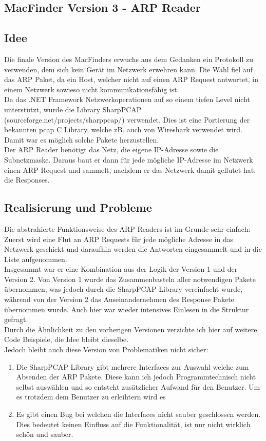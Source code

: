 \documentclass[12pt,a4paper]{report}
\begin{document}
\begin{onehalfspace}
\section{MacFinder Version 3 - ARP Reader}
\subsection{Idee}
Die finale Version des MacFinders erwuchs aus dem Gedanken ein Protokoll zu verwenden, dem sich kein Gerät im Netzwerk erwehren kann. Die Wahl fiel auf das ARP Paket, da ein Host, welcher nicht auf einen ARP Request antwortet, in einem Netzwerk sowieso nicht kommunikationsfähig ist.\\
Da das .NET Framework Netzwerkoperationen auf so einem tiefen Level nicht unterstützt, wurde die Library SharpPCAP (sourceforge.net/projects/sharppcap/) verwendet. Dies ist eine Portierung der bekannten pcap C Library, welche zB. auch von Wireshark verwendet wird. Damit war es möglich solche Pakete herzustellen.\\
Der ARP Reader benötigt das Netz, die eigene IP-Adresse sowie die Subnetzmaske. Daraus baut er dann für jede mögliche IP-Adresse im Netzwerk einen ARP Request und sammelt, nachdem er das Netzwerk damit geflutet hat, die Responses.\\
\subsection{Realisierung und Probleme}
Die abstrahierte Funktionsweise des ARP-Readers ist im Grunde sehr einfach: Zuerst wird eine Flut an ARP Requests für jede mögliche Adresse in das Netzwerk geschickt und daraufhin werden die Antworten eingesammelt und in die Liste aufgenommen.\\
Insgesammt war er eine Kombination aus der Logik der Version 1 und der Version 2. Von Version 1 wurde das Zusammenbasteln aller notwendigen Pakete übernommen, was jedoch durch die SharpPCAP Library vereinfacht wurde, während von der Version 2 das Auseinandernehmen des Response Pakete übernommen wurde. Auch hier war wieder intensives Einlesen in die Struktur gefragt.\\
Durch die Ähnlichkeit zu den vorherigen Versionen verzichte ich hier auf weitere Code Beispiele, die Idee bleibt dieselbe.\\

Jedoch bleibt auch diese Version von Problematiken nicht sicher:\\
\begin{enumerate}
\item Die SharpPCAP Library gibt mehrere Interfaces zur Auswahl welche zum Absenden der ARP Pakete. Diese kann ich jedoch Programmtechnisch nicht selbst auswählen und so entsteht zusätzlicher Aufwand für den Benutzer. Um es trotzdem dem Benutzer zu erleihtern wird es
\item Es gibt einen Bug bei welchen die Interfaces nicht sauber geschlossen werden. Dies bedeutet keinen Einfluss auf die Funktionalität, ist nur nicht wirklich schön und sauber.
\end{enumerate}


\end{onehalfspace}
\end{document}

